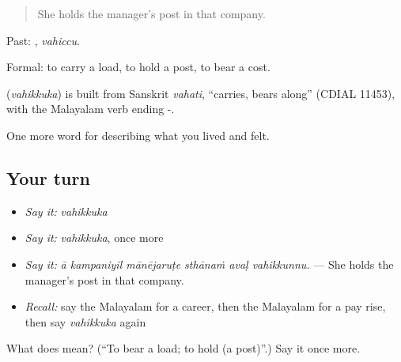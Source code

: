 \begin{quote}
She holds the manager's post in that company.
\end{quote}

Past: , \emph{vahiccu}.

Formal: to carry a load, to hold a post, to bear a cost.

\begin{cousinweb}
\textbf{} (\emph{vahikkuka}) is built from Sanskrit \emph{vahati}, \textquotedblleft{}carries, bears along\textquotedblright{} (CDIAL 11453), with the Malayalam verb ending -.
\end{cousinweb}

\begin{grammarlens}[title={What you've built}]
One more word for describing what you lived and felt.
\end{grammarlens}

\subsection*{Your turn}
\begin{itemize}
\raggedright
  \item \emph{Say it:} \emph{vahikkuka}
  \item \emph{Say it:} \emph{vahikkuka}, once more
  \item \emph{Say it:} \emph{ā kampaniyil mānējaruṭe sthānaṁ avaḷ vahikkunnu.} — She holds the manager's post in that company.
  \item \emph{Recall:} say the Malayalam for a career, then the Malayalam for a pay rise, then say \emph{vahikkuka} again
\end{itemize}

\begin{tcolorbox}[breakable,colback=teal!4,colframe=teal!35!black,title={Before you move on}]
What does  mean? (\textquotedblleft{}To bear a load; to hold (a post)\textquotedblright{}.) Say it once more.
\end{tcolorbox}
